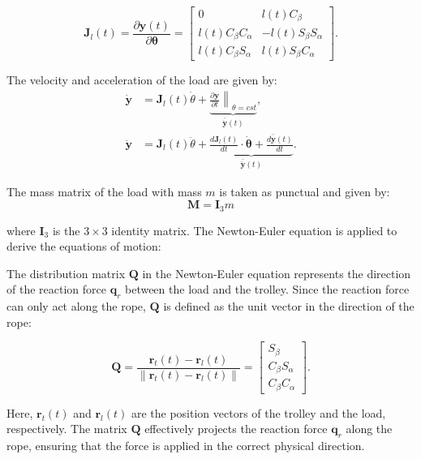 \begin{equation}
    \boldsymbol{J}_{l}(t) = \frac{\partial \boldsymbol{y}(t)}{\partial \boldsymbol{\theta}} = \begin{bmatrix}
        0                       & l(t)C_\beta \\
        l(t)C_\beta C_\alpha   & -l(t)S_\beta S_\alpha \\
        l(t)C_\beta S_\alpha   & l(t)S_\beta C_\alpha
    \end{bmatrix}.
\end{equation}

The velocity and acceleration of the load are given by:
\begin{align}
    \dot{\boldsymbol{y}} &= \boldsymbol{J}_{l}(t) \dot{\theta} + \underbrace{ \left. \frac{\partial \boldsymbol{y}}{\partial t} \right\|_{\theta=cst}}_{\bar{\dot{\boldsymbol{y}}}(t)}, \\
    \ddot{\boldsymbol{y}} &= \boldsymbol{J}_{l}(t) \ddot{\theta} + \underbrace{\frac{d\boldsymbol{J}_{l}(t)}{dt} \cdot \dot{\boldsymbol{\theta}} + \frac{d\bar{\dot{\boldsymbol{y}}}(t)}{dt}}_{\bar{\ddot{\boldsymbol{y}}}(t)}.
\end{align}

The mass matrix of the load with mass \(m\) is taken as punctual and given by:
\begin{equation}
    \boldsymbol{M} = \boldsymbol{I}_3 m
\end{equation}

where \(\boldsymbol{I}_3\) is the \(3 \times 3\) identity matrix. The Newton-Euler equation is 
applied to derive the equations of motion:

The distribution matrix \(\boldsymbol{Q}\) in the Newton-Euler equation represents the direction of 
the reaction force \(\boldsymbol{q}_r\) between the load and the trolley. Since the reaction 
force can only act along the rope, \(\boldsymbol{Q}\) is defined as the unit vector in the 
direction of the rope:

\begin{equation}
    \boldsymbol{Q} = \frac{\boldsymbol{r}_t(t) - \boldsymbol{r}_l(t)}{\left\|\boldsymbol{r}_t(t) - \boldsymbol{r}_l(t)\right\|} = \begin{bmatrix}
    S_\beta \\
    C_\beta S_\alpha \\
    C_\beta C_\alpha
    \end{bmatrix}.
\end{equation}

Here, \(\boldsymbol{r}_t(t)\) and \(\boldsymbol{r}_l(t)\) are the position vectors of the 
trolley and the load, respectively. The matrix \(\boldsymbol{Q}\) effectively projects the 
reaction force \(\boldsymbol{q}_r\) along the rope, ensuring that the force is applied in the correct 
physical direction. 


